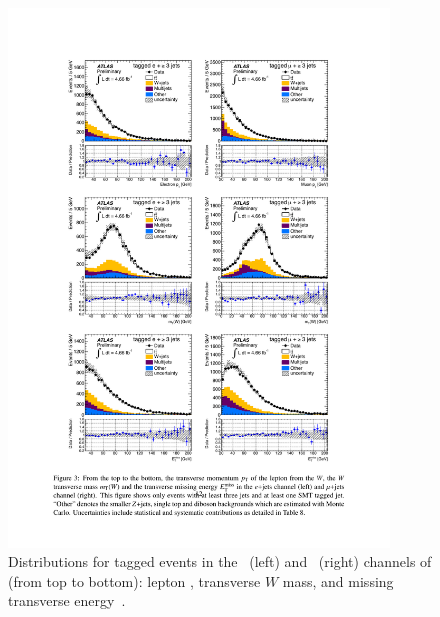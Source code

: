 \begin{figure}[htbp]
  \centering
    \includegraphics[width=0.90\textwidth]{PartCrossSection/Plots/h_stacks_elmu_evt_pars.pdf}
    \caption[Distributions for tagged events in the \ejets\ (left) and \mujets\ (right) channels of (from top to bottom): lepton \pt, transverse $W$ mass, and missing transverse energy.]{Distributions for tagged events in the \ejets\ (left) and \mujets\ (right) channels of (from top to bottom): lepton \pt, transverse $W$ mass, and missing transverse energy~\cite{Cross:SMTCrossSectionPaper}.}
  \label{fig:CrossBackgroundShapes}
\end{figure}

